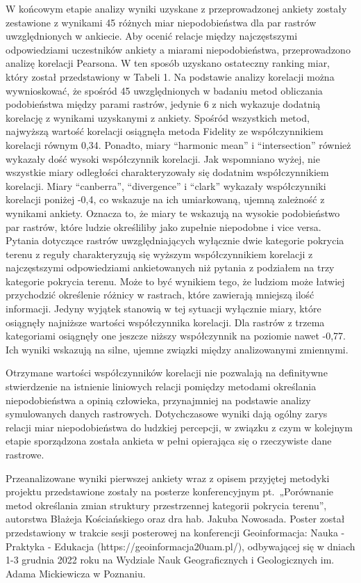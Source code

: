 \documentclass{amuthesis}
\begin{document}
W końcowym etapie analizy wyniki uzyskane z przeprowadzonej ankiety
zostały zestawione z wynikami 45 różnych miar niepodobieństwa dla par
rastrów uwzględnionych w ankiecie. Aby ocenić relacje między
najczęstszymi odpowiedziami uczestników ankiety a miarami
niepodobieństwa, przeprowadzono analizę korelacji Pearsona. W ten sposób
uzyskano ostateczny ranking miar, który został przedstawiony w Tabeli 1.
Na podstawie analizy korelacji można wywnioskować, że spośród 45
uwzględnionych w badaniu metod obliczania podobieństwa między parami
rastrów, jedynie 6 z nich wykazuje dodatnią korelację z wynikami
uzyskanymi z ankiety. Spośród wszystkich metod, najwyższą wartość
korelacji osiągnęła metoda Fidelity ze współczynnikiem korelacji równym
0,34. Ponadto, miary ``harmonic mean'' i ``intersection'' również
wykazały dość wysoki współczynnik korelacji. Jak wspomniano wyżej, nie
wszystkie miary odległości charakteryzowały się dodatnim współczynnikiem
korelacji. Miary ``canberra'', ``divergence'' i ``clark'' wykazały
współczynniki korelacji poniżej -0,4, co wskazuje na ich umiarkowaną,
ujemną zależność z wynikami ankiety. Oznacza to, że miary te wskazują na
wysokie podobieństwo par rastrów, które ludzie określiliby jako zupełnie
niepodobne i vice versa. Pytania dotyczące rastrów uwzględniających
wyłącznie dwie kategorie pokrycia terenu z reguły charakteryzują się
wyższym współczynnikiem korelacji z najczęstszymi odpowiedziami
ankietowanych niż pytania z podziałem na trzy kategorie pokrycia terenu.
Może to być wynikiem tego, że ludziom może łatwiej przychodzić
określenie różnicy w rastrach, które zawierają mniejszą ilość
informacji. Jedyny wyjątek stanowią w tej sytuacji wyłącznie miary,
które osiągnęły najniższe wartości współczynnika korelacji. Dla rastrów
z trzema kategoriami osiągnęły one jeszcze niższy współczynnik na
poziomie nawet -0,77. Ich wyniki wskazują na silne, ujemne związki
między analizowanymi zmiennymi.

Otrzymane wartości współczynników korelacji nie pozwalają na definitywne
stwierdzenie na istnienie liniowych relacji pomiędzy metodami określania
niepodobieństwa a opinią człowieka, przynajmniej na podstawie analizy
symulowanych danych rastrowych. Dotychczasowe wyniki dają ogólny zarys
relacji miar niepodobieństwa do ludzkiej percepcji, w związku z czym w
kolejnym etapie sporządzona została ankieta w pełni opierająca się o
rzeczywiste dane rastrowe.

Przeanalizowane wyniki pierwszej ankiety wraz z opisem przyjętej
metodyki projektu przedstawione zostały na posterze konferencyjnym
pt.~„Porównanie metod określania zmian struktury przestrzennej kategorii
pokrycia terenu'', autorstwa Błażeja Kościańskiego oraz dra hab. Jakuba
Nowosada. Poster został przedstawiony w trakcie sesji posterowej na
konferencji Geoinformacja: Nauka - Praktyka - Edukacja
(https://geoinformacja20uam.pl/), odbywającej się w dniach 1-3 grudnia
2022 roku na Wydziale Nauk Geograficznych i Geologicznych im. Adama
Mickiewicza w Poznaniu.
\end{document}
